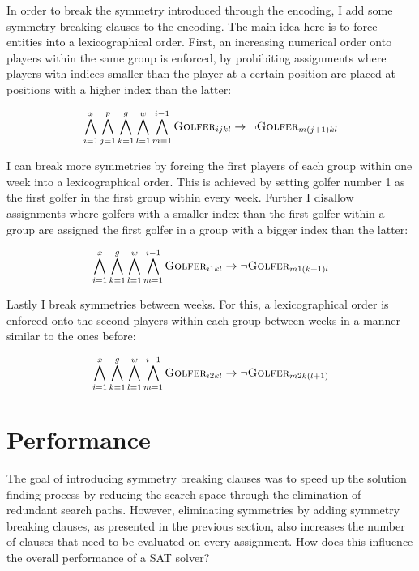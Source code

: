 \documentclass[a4paper]{scrartcl}
\begin{document}
In order to break the symmetry introduced through the encoding, I add some symmetry-breaking clauses to the encoding. The main idea here is to force entities into a lexicographical order. First, an increasing numerical order onto players within the same group is enforced, by prohibiting assignments where players with indices smaller than the player at a certain position are placed at positions with a higher index than the latter:

\begin{equation}
\centering
    \bigwedge \limits_{i=1}^x
    \bigwedge \limits_{j=1}^p
    \bigwedge \limits_{k=1}^g
    \bigwedge \limits_{l=1}^w
    \bigwedge \limits_{m=1}^{i-1}
    \textsc{Golfer}_{ijkl}
    \to
    \neg \textsc{Golfer}_{m(j+1)kl}
\end{equation}

I can break more symmetries by forcing the first players of each group within one week into a lexicographical order. This is achieved by setting golfer number 1 as the first golfer in the first group within every week. Further I disallow assignments where golfers with a smaller index than the first golfer within a group are assigned the first golfer in a group with a bigger index than the latter:

\begin{equation}
\centering
    \bigwedge \limits_{i=1}^x
    \bigwedge \limits_{k=1}^g
    \bigwedge \limits_{l=1}^w
    \bigwedge \limits_{m=1}^{i-1}
    \textsc{Golfer}_{i1kl}
    \to
    \neg \textsc{Golfer}_{m1(k+1)l}
\end{equation}

Lastly I break symmetries between weeks. For this, a lexicographical order is enforced onto the second players within each group between weeks in a manner similar to the ones before:

\begin{equation}
\centering
    \bigwedge \limits_{i=1}^x
    \bigwedge \limits_{k=1}^g
    \bigwedge \limits_{l=1}^w
    \bigwedge \limits_{m=1}^{i-1}
    \textsc{Golfer}_{i2kl}
    \to
    \neg \textsc{Golfer}_{m2k(l+1)}
\end{equation}


\section{Performance}

The goal of introducing symmetry breaking clauses was to speed up the solution finding process by reducing the search space through the elimination of redundant search paths. However, eliminating symmetries by adding symmetry breaking clauses, as presented in the previous section, also increases the number of clauses that need to be evaluated on every assignment. How does this influence the overall performance of a SAT solver?
\end{document}
